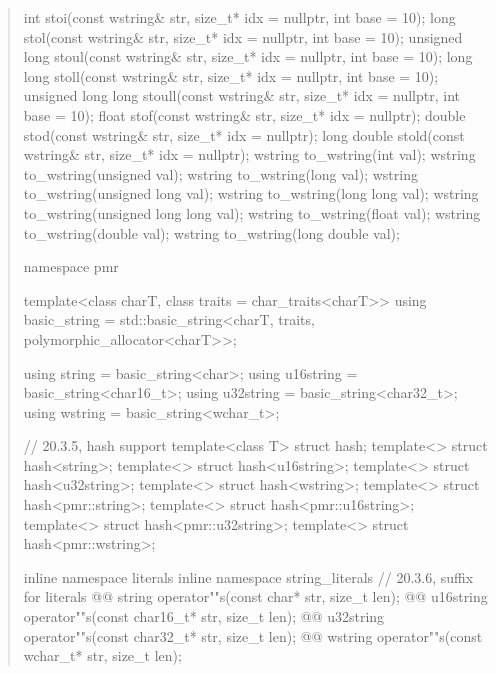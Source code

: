 \documentclass{wg21}
\begin{document}
\begin{quote}
\begin{codeblock}
{  int stoi(const wstring& str, size_t* idx = nullptr, int base = 10);
  long stol(const wstring& str, size_t* idx = nullptr, int base = 10);
  unsigned long stoul(const wstring& str, size_t* idx = nullptr, int base = 10);
  long long stoll(const wstring& str, size_t* idx = nullptr, int base = 10);
  unsigned long long stoull(const wstring& str, size_t* idx = nullptr, int base = 10);
  float stof(const wstring& str, size_t* idx = nullptr);
  double stod(const wstring& str, size_t* idx = nullptr);
  long double stold(const wstring& str, size_t* idx = nullptr);
  wstring to_wstring(int val);
  wstring to_wstring(unsigned val);
  wstring to_wstring(long val);
  wstring to_wstring(unsigned long val);
  wstring to_wstring(long long val);
  wstring to_wstring(unsigned long long val);
  wstring to_wstring(float val);
  wstring to_wstring(double val);
  wstring to_wstring(long double val);

  namespace pmr {
    template<class charT, class traits = char_traits<charT>>
      using basic_string = std::basic_string<charT, traits, polymorphic_allocator<charT>>;

    using string    = basic_string<char>;
    using u16string = basic_string<char16_t>;
    using u32string = basic_string<char32_t>;
    using wstring   = basic_string<wchar_t>;
  }

  // 20.3.5, hash support
  template<class T> struct hash;
  template<> struct hash<string>;
  template<> struct hash<u16string>;
  template<> struct hash<u32string>;
  template<> struct hash<wstring>;
  template<> struct hash<pmr::string>;
  template<> struct hash<pmr::u16string>;
  template<> struct hash<pmr::u32string>;
  template<> struct hash<pmr::wstring>;

  inline namespace literals {
  inline namespace string_literals {
    // 20.3.6, suffix for  literals
    @@ string    operator""s(const char* str, size_t len);
    @@ u16string operator""s(const char16_t* str, size_t len);
    @@ u32string operator""s(const char32_t* str, size_t len);
    @@ wstring   operator""s(const wchar_t* str, size_t len);
  }
  }
}
\end{codeblock}
\end{quote}
\end{document}

